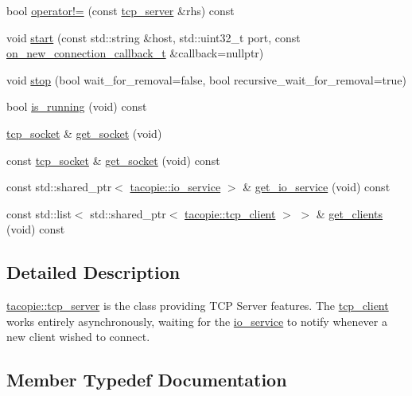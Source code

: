 \begin{DoxyCompactItemize}
\item 
bool \hyperlink{classtacopie_1_1tcp__server_aa45611b77d60b536aeaf626d1724342d}{operator!=} (const \hyperlink{classtacopie_1_1tcp__server}{tcp\+\_\+server} \&rhs) const
\item 
void \hyperlink{classtacopie_1_1tcp__server_a6cb98b50d865b32dba497273a0eca1e9}{start} (const std\+::string \&host, std\+::uint32\+\_\+t port, const \hyperlink{classtacopie_1_1tcp__server_a103cb4e6fcab00f88a708aabd38b66ff}{on\+\_\+new\+\_\+connection\+\_\+callback\+\_\+t} \&callback=nullptr)
\item 
void \hyperlink{classtacopie_1_1tcp__server_abc099e162432e2218faed93fc84180fd}{stop} (bool wait\+\_\+for\+\_\+removal=false, bool recursive\+\_\+wait\+\_\+for\+\_\+removal=true)
\item 
bool \hyperlink{classtacopie_1_1tcp__server_a76162141e6443953f3ad8e11c4e4d3d7}{is\+\_\+running} (void) const
\item 
\hyperlink{classtacopie_1_1tcp__socket}{tcp\+\_\+socket} \& \hyperlink{classtacopie_1_1tcp__server_a39a51b9203d42babfd9c4c1a0f4cc340}{get\+\_\+socket} (void)
\item 
const \hyperlink{classtacopie_1_1tcp__socket}{tcp\+\_\+socket} \& \hyperlink{classtacopie_1_1tcp__server_a373aec294e24a52c3ef6c44920af36e2}{get\+\_\+socket} (void) const
\item 
const std\+::shared\+\_\+ptr$<$ \hyperlink{classtacopie_1_1io__service}{tacopie\+::io\+\_\+service} $>$ \& \hyperlink{classtacopie_1_1tcp__server_aace4796627b6abccccce1a541908414f}{get\+\_\+io\+\_\+service} (void) const
\item 
const std\+::list$<$ std\+::shared\+\_\+ptr$<$ \hyperlink{classtacopie_1_1tcp__client}{tacopie\+::tcp\+\_\+client} $>$ $>$ \& \hyperlink{classtacopie_1_1tcp__server_a0df81b943243ad51102c37d4944be8d7}{get\+\_\+clients} (void) const
\end{DoxyCompactItemize}


\subsection{Detailed Description}
\hyperlink{classtacopie_1_1tcp__server}{tacopie\+::tcp\+\_\+server} is the class providing T\+CP Server features. The \hyperlink{classtacopie_1_1tcp__client}{tcp\+\_\+client} works entirely asynchronously, waiting for the \hyperlink{classtacopie_1_1io__service}{io\+\_\+service} to notify whenever a new client wished to connect. 

\subsection{Member Typedef Documentation}
\mbox{\label{classtacopie_1_1tcp__server_a103cb4e6fcab00f88a708aabd38b66ff}} 

